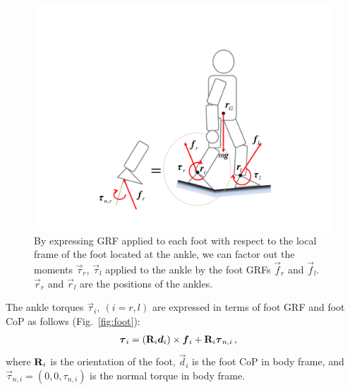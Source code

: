 \documentclass{llncs}
\newcommand {\mat}[1] {{\bf #1}}
\newcommand{\mR} {\mat{R}}
\newcommand{\vr}{\vec{r}}
\newcommand{\vtau}{\vec{\tau}}
\newcommand{\vd}{\vec{d}}
\newcommand{\vf}{\vec{f}}
\begin{document}
\begin{figure}[h]
\begin{center}
\includegraphics[width = 0.7\columnwidth]{Figures/double_support.pdf}
\end{center}
\caption{By expressing GRF applied to each foot with respect
to the local frame of the foot located at the ankle,
we can factor out the moments $\vtau_r$, $\vtau_l$ applied
to the ankle by the foot GRFs $\vf_r$ and $\vf_l$.
$\vr_r$ and $\vr_l$ are the positions of the ankles.}
\label{fig:double_support}
\end{figure}

The ankle torques $\vtau_i,~(i=r,l)$ are expressed in terms of
foot GRF and foot CoP as follows (Fig.~\ref{fig:foot}):
\begin{align}
	\vtau_i &= (\mR_i \vd_i) \times \vf_i + \mR_i\vtau_{n,i}  \, ,\label{eq:vmi}
\end{align}
where $\mR_i$ is the orientation of the foot, $\vd_i$ is the foot CoP in body frame,
and $\vtau_{n,i}=(0,0,\tau_{n,i})$ is the normal torque in body frame.
\end{document}
